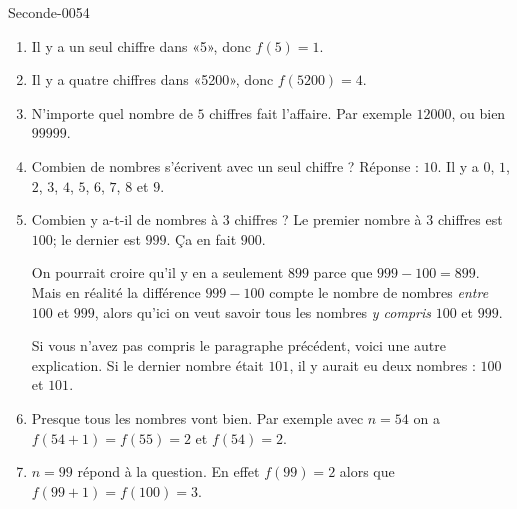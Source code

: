 
\begin{corrige}{Seconde-0054}

    \begin{enumerate}
        \item
            Il y a un seul chiffre dans «5», donc \( f(5)=1\).
        \item
            Il y a quatre chiffres dans «5200», donc \( f(5200)=4\).
        \item
            N'importe quel nombre de \( 5\) chiffres fait l'affaire. Par exemple \( 12000\), ou bien \( 99999\).
        \item
            Combien de nombres s'écrivent avec un seul chiffre ? Réponse : \( 10\). Il y a \( 0\), \( 1\), \( 2\), \( 3\), \( 4\), \( 5\), \( 6\), \( 7\), \( 8\) et \( 9\).
        \item
            Combien y a-t-il de nombres à $3$ chiffres ? Le premier nombre à \( 3\) chiffres est \( 100\); le dernier est \( 999\). Ça en fait \( 900\).

            On pourrait croire qu'il y en a seulement \( 899\) parce que \( 999-100=899\). Mais en réalité la différence \( 999-100\) compte le nombre de nombres \emph{entre} \( 100\) et \( 999\), alors qu'ici on veut savoir tous les nombres \emph{y compris} \( 100\) et \( 999\).

            Si vous n'avez pas compris le paragraphe précédent, voici une autre explication. Si le dernier nombre était \( 101\), il y aurait eu deux nombres : \( 100\) et \( 101\).
        \item
            Presque tous les nombres vont bien. Par exemple avec \( n=54\) on a \( f(54+1)=f(55)=2\) et \( f(54)=2\).
        \item
            \( n=99\) répond à la question. En effet \( f(99)=2\) alors que \( f(99+1)=f(100)=3\).
    \end{enumerate}

\end{corrige}
